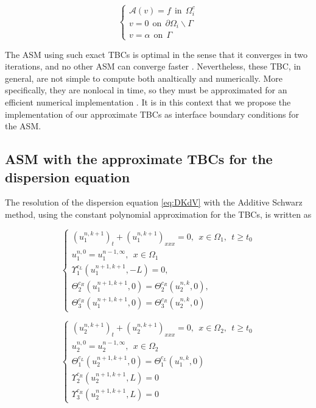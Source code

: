 \begin{equation*}
\begin{cases}
\mathcal{A}(v) = f \ \ \text{in} \ \ \Omega_i^c\\
v = 0 \ \ \text{on} \ \ \partial \Omega_i \backslash \Gamma \\
v = \alpha \ \ \text{on} \ \ \Gamma
\end{cases}
\end{equation*}

\indent The ASM using such exact TBCs is optimal in the sense that it converges in two iterations, and no other ASM can converge faster \cite{Japhet2003}. Nevertheless, these TBC, in general, are not simple to compute both analtically and numerically. More specifically, they are nonlocal in time, so they must be approximated for an efficient numerical implementation \cite{Xavieretal2008}. It is in this context that we propose the implementation of our approximate TBCs as interface boundary conditions for the ASM.

\subsection{ASM with the approximate TBCs for the dispersion equation}

\indent The resolution of the dispersion equation \eqref{eq:DKdV} with the Additive Schwarz method, using the constant polynomial approximation for the TBCs, is written as

\begin{equation}
    \label{eq:problemDDM1}
    \begin{cases}
        (u_1^{n,k+1})_t + (u_1^{n,k+1})_{xxx} = 0 , \ \ x \in \Omega_1, \ \ t \geq t_0\\
        u_1^{n,0} = u_1^{n-1,\infty} , \ \ x \in \Omega_1 \\
        \Upsilon_1^{c_L}(u_1^{n+1,k+1},-L) = 0, \\ 
        \Theta_2^{c_R}(u_1^{n+1,k+1},0) = \Theta_2^{c_R}(u_2^{n,k},0) , \\
        \Theta_3^{c_R}(u_1^{n+1,k+1},0) = \Theta_3^{c_R}(u_2^{n,k},0)
     \end{cases}
\end{equation}

\begin{equation}
    \label{eq:problemDDM2}
    \begin{cases}
        (u_2^{n,k+1})_t + (u_2^{n,k+1})_{xxx} = 0 , \ \ x \in \Omega_2, \ \ t \geq t_0\\
        u_2^{n,0} = u_2^{n-1,\infty} , \ \ x \in \Omega_2 \\
        \Theta_1^{c_L}(u_2^{n+1,k+1},0) = \Theta_1^{c_L}(u_1^{n,k},0) \\
        \Upsilon_2^{c_R}(u_2^{n+1,k+1},L) = 0 \\
        \Upsilon_3^{c_R}(u_2^{n+1,k+1},L) = 0
     \end{cases}
\end{equation}

